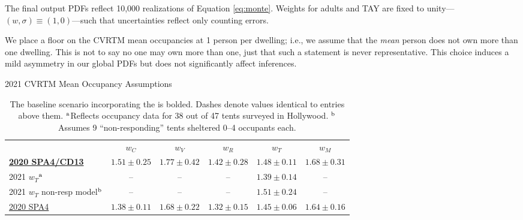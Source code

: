 \documentclass[11pt,twocolumn]{article}
\begin{document}
The final output PDFs reflect 10,000 realizations of Equation \ref{eq:monte}. Weights for 
adults and TAY are fixed to unity---$(w,\sigma)\equiv(1,0)$---such that uncertainties reflect only 
counting errors. 


We place a floor on the CVRTM mean occupancies at 1 person per dwelling; i.e., we assume that the 
{\it mean} person does not own more than one dwelling. This is not to say no one may own more than 
one, just that such a statement is never representative. This choice induces a mild asymmetry in our 
global PDFs but does not significantly affect inferences.

\begin{table}[t]
\centering
\caption{2021 CVRTM Mean Occupancy Assumptions}
\begin{tabular}{lccccc}
\toprule
 & $w_{C}$ & $w_{V}$ & $w_{R}$ & $w_{T}$ & $w_{M}$ \\ \cmidrule{1-6}
\href{https://www.lahsa.org/documents?id=4635-usc-2018-2020-multipliers-and-estimates-overview}{\bf 2020 SPA4/CD13} & $1.51\pm0.25$ & $1.77\pm0.42$ & $1.42\pm0.28$ & $1.48\pm0.11$ & $1.68\pm0.31$ \\
2021 $w_{T}$$^{\rm a}$ & -- & -- & -- & $1.39\pm0.14$ & --\\
2021 $w_{T}$ non-resp model$^{\rm b}$ & -- & -- & --& $1.51\pm0.24$ & --\\
\href{https://www.lahsa.org/documents?id=4693-2020-greater-los-angeles-homeless-count-cvrtm-conversion-factors}{2020 SPA4} & $1.38\pm0.11$ & $1.68\pm0.22$ & $1.32\pm0.15$ & $1.45\pm0.06$ & $1.64\pm0.16$\\
\bottomrule
\end{tabular}
\caption*{The baseline scenario incorporating the is bolded. Dashes denote values identical to entries 
above them.
$^{\rm a}$Reflects occupancy data for 38 out of 47 tents surveyed in Hollywood. 
$^{\rm b}$Assumes 9 ``non-responding'' tents sheltered 0--4 occupants each.}
\label{tbl:weights}
\end{table}
\end{document}
